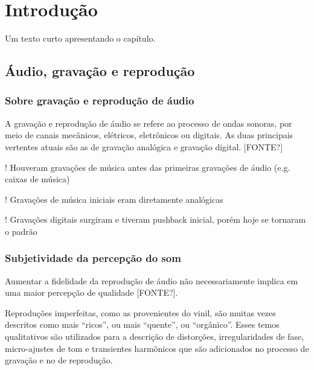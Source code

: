 
\chapter{Introdução}\label{cap:introducao}

Um texto curto apresentando o capítulo.

\section{Áudio, gravação e reprodução}\label{sec:audioGravacaoReproducao}
\subsection{Sobre gravação e reprodução de áudio}\label{subsec:gravacaoReproducaoAudio}

A gravação e reprodução de áudio se refere ao processo de ondas sonoras, por meio de canais mecânicos, elétricos, eletrônicos ou digitais. As duas principais vertentes atuais são as de gravação analógica e gravação digital. [FONTE?]

! Houveram gravações de música antes das primeiras gravações de áudio (e.g. caixas de música)

! Gravações de música iniciais eram diretamente analógicas

! Gravações digitais surgiram e tiveram pushback inicial, porém hoje se tornaram o padrão


\subsection{Subjetividade da percepção do som}\label{subsec:subjetividadeSom}

Aumentar a fidelidade da reprodução de áudio não necessariamente implica em uma maior percepção de qualidade [FONTE?]. 

Reproduções imperfeitas, como as provenientes do vinil, são muitas vezes descritos como mais “ricos”, ou mais “quente”, ou “orgânico”. Esses temos qualitativos são utilizados para a descrição de distorções, irregularidades de fase, micro-ajustes de tom e transientes harmônicos que são adicionados no processo de gravação e no de reprodução. 

